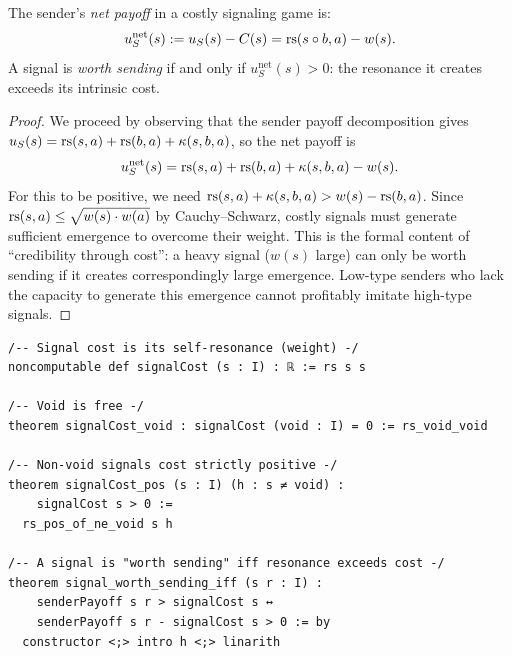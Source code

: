 \begin{theorem}
\label{thm:costly-net}
The sender's \emph{net payoff} in a costly signaling game is:
\[
u_S^{\text{net}}(s) := u_S(s) - C(s) = \mathrm{rs}(s \circ b, a) - w(s).
\]
A signal is \emph{worth sending} if and only if $u_S^{\text{net}}(s) > 0$:
the resonance it creates exceeds its intrinsic cost.
\end{theorem}

\begin{proof}
We proceed by observing that the sender payoff decomposition gives
$u_S(s) = \mathrm{rs}(s, a) + \mathrm{rs}(b, a) + \kappa(s, b, a)$, so the net payoff is
\[
u_S^{\text{net}}(s) = \mathrm{rs}(s, a) + \mathrm{rs}(b, a) + \kappa(s, b, a) - w(s).
\]
For this to be positive, we need $\mathrm{rs}(s, a) + \kappa(s, b, a) > w(s) - \mathrm{rs}(b, a)$.
Since $\mathrm{rs}(s, a) \leq \sqrt{w(s) \cdot w(a)}$ by Cauchy--Schwarz, costly
signals must generate sufficient emergence to overcome their weight. This is
the formal content of ``credibility through cost'': a heavy signal ($w(s)$ large)
can only be worth sending if it creates correspondingly large emergence. Low-type
senders who lack the capacity to generate this emergence cannot profitably
imitate high-type signals.
\end{proof}

\begin{lstlisting}[caption={Lean 4: Costly signaling}]
/-- Signal cost is its self-resonance (weight) -/
noncomputable def signalCost (s : I) : ℝ := rs s s

/-- Void is free -/
theorem signalCost_void : signalCost (void : I) = 0 := rs_void_void

/-- Non-void signals cost strictly positive -/
theorem signalCost_pos (s : I) (h : s ≠ void) :
    signalCost s > 0 :=
  rs_pos_of_ne_void s h

/-- A signal is "worth sending" iff resonance exceeds cost -/
theorem signal_worth_sending_iff (s r : I) :
    senderPayoff s r > signalCost s ↔
    senderPayoff s r - signalCost s > 0 := by
  constructor <;> intro h <;> linarith
\end{lstlisting}

